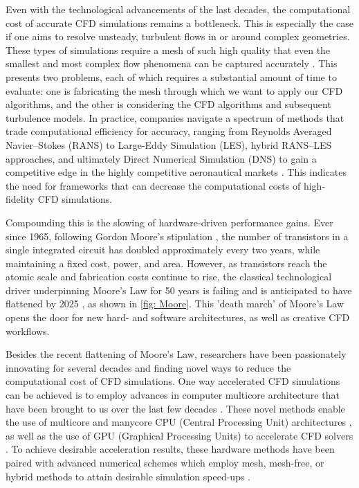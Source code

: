 Even with the technological advancements of the last decades, the computational cost of accurate CFD simulations remains a bottleneck. This is especially the case if one aims to resolve unsteady, turbulent flows in or around complex geometries. These types of simulations require a mesh of such high quality that even the smallest and most complex flow phenomena can be captured accurately \cite{Spalart2000}. This presents two problems, each of which requires a substantial amount of time to evaluate: one is fabricating the mesh through which we want to apply our CFD algorithms, and the other is considering the CFD algorithms and subsequent turbulence models. In practice, companies navigate a spectrum of methods that trade computational efficiency for accuracy, ranging from Reynolds Averaged Navier–Stokes (RANS) to Large-Eddy Simulation (LES), hybrid RANS–LES approaches, and ultimately Direct Numerical Simulation (DNS) to gain a competitive edge in the highly competitive aeronautical markets \cite{Spalart2000}. This indicates the need for frameworks that can decrease the computational costs of high-fidelity CFD simulations. 

Compounding this is the slowing of hardware-driven performance gains. Ever since 1965, following Gordon Moore's stipulation \cite{moore1965}, the number of transistors in a single integrated circuit has doubled approximately every two years, while maintaining a fixed cost, power, and area. However, as transistors reach the atomic scale and fabrication costs continue to rise, the classical technological driver underpinning Moore's Law for 50 years is failing and is anticipated to have flattened by 2025 \cite{Shalf2020}, as shown in \autoref{fig: Moore}. This 'death march' of Moore's Law \cite{Markov2014} opens the door for new hard- and software architectures, as well as creative CFD workflows. 

Besides the recent flattening of Moore's Law, researchers have been passionately innovating for several decades and finding novel ways to reduce the computational cost of CFD simulations. One way accelerated CFD simulations can be achieved is to employ advances in computer multicore architecture that have been brought to us over the last few decades \cite{Hosain2015}. These novel methods enable the use of multicore and manycore CPU (Central Processing Unit) architectures \cite{Hadade2016}, as well as the use of GPU (Graphical Processing Units) to accelerate CFD solvers \cite{Xiang2017}. To achieve desirable acceleration results, these hardware methods have been paired with advanced numerical schemes which employ mesh, mesh-free, or hybrid methods to attain desirable simulation speed-ups \cite{Hosain2015}. 

